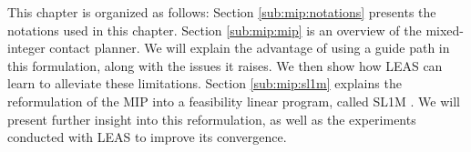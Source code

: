 

This chapter is organized as follows:
Section \ref{sub:mip:notations} presents the notations used in this chapter.
Section \ref{sub:mip:mip} is an overview of the mixed-integer contact planner.
We will explain the advantage of using a guide path in this formulation, along with the issues it raises.
We then show how LEAS can learn to alleviate these limitations.
Section \ref{sub:mip:sl1m} explains the reformulation of the MIP into a feasibility linear program, called SL1M \cite{sl1m_v1}. 
We will present further insight into this reformulation, as well as the experiments conducted with LEAS to improve its convergence.

